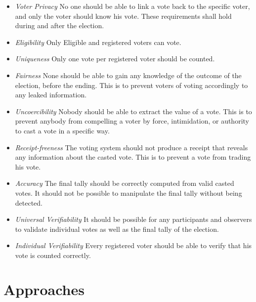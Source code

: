 \cite{Cet08}
\begin{itemize}
    \item \textit{Voter Privacy}
        No one should be able to link a vote back to the specific voter, and only the voter should
        know his vote. These requirements shall hold during and after the election.  
    
    \item \textit{Eligibility}    
        Only Eligible and registered voters can vote. 
    
    \item \textit{Uniqueness}
        Only one vote per registered voter should be counted.
    
    \item \textit{Fairness}
        None should be able to gain any knowledge of the outcome of the election, before the ending. This is to prevent voters of voting accordingly to any leaked information. 
    
    \item \textit{Uncoercibility}
        Nobody should be able to extract the value of a vote. This is to prevent anybody from compelling a voter by force, intimidation, or authority to cast a vote in a specific way. 
    
    \item \textit{Receipt-freeness} 
        The voting system should not produce a receipt that reveals any information about the casted vote. This is to prevent a vote from trading his vote. 
    
    \item \textit{Accuracy} 
        The final tally should be correctly computed from valid casted votes. It should not be
        possible to manipulate the final tally without being detected. 
    
    \item \textit{Universal Verifiability}
        It should be possible for any participants and observers to validate individual votes as well as the final tally of the election. 
    
    \item \textit{Individual Verifiability}    
        Every registered voter should be able to verify that his vote is counted correctly. 
    
\end{itemize}

\section{Approaches}

